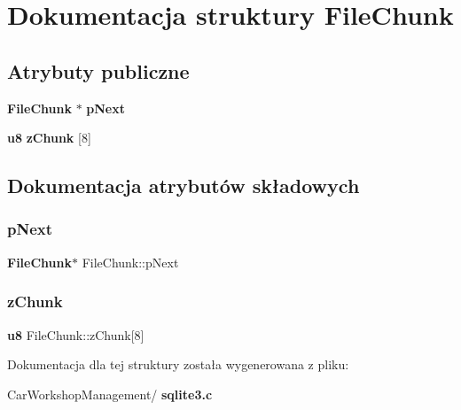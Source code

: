 \section{Dokumentacja struktury File\+Chunk}
\label{struct_file_chunk}
\subsection*{Atrybuty publiczne}
\begin{DoxyCompactItemize}
\item 
\textbf{ File\+Chunk} $\ast$ \textbf{ p\+Next}
\item 
\textbf{ u8} \textbf{ z\+Chunk} [8]
\end{DoxyCompactItemize}


\subsection{Dokumentacja atrybutów składowych}
\mbox{\label{struct_file_chunk_ad2d0d170afc7ce1e239e8716852e247b}} 
\subsubsection{pNext}
{\footnotesize\ttfamily \textbf{ File\+Chunk}$\ast$ File\+Chunk\+::p\+Next}

\mbox{\label{struct_file_chunk_a1e7a92812b21bba27661fb38a5f597a7}} 
\subsubsection{zChunk}
{\footnotesize\ttfamily \textbf{ u8} File\+Chunk\+::z\+Chunk[8]}



Dokumentacja dla tej struktury została wygenerowana z pliku\+:\begin{DoxyCompactItemize}
\item 
Car\+Workshop\+Management/\textbf{ sqlite3.\+c}\end{DoxyCompactItemize}

